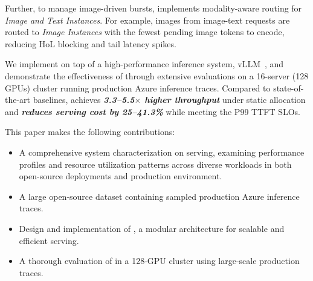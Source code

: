 Further, to manage image-driven bursts, \sysname{} implements modality-aware routing for \emph{Image and Text Instances}.
For example, images from image-text requests are routed to \emph{Image Instances} with the fewest pending image tokens to encode, reducing HoL blocking and tail latency spikes.

We implement \sysname{} on top of a high-performance inference system, vLLM~\cite{vllm}, and demonstrate the effectiveness of \sysname{} through extensive evaluations on a 16-server (128 GPUs) cluster running production Azure \lmm{} inference traces.
Compared to state-of-the-art baselines, \sysname{} achieves \textbf{\textit{3.3--5.5$\times$ higher throughput}} under static allocation and \textbf{\textit{reduces \lmm{} serving cost by 25--41.3\%}} while meeting the P99 TTFT SLOs.

This paper makes the following contributions:
\begin{itemize}[leftmargin=*]
\item A comprehensive system characterization on \lmm{} serving, examining performance profiles and resource utilization patterns across diverse workloads in both open-source \lmm deployments and production environment.
\item A large open-source dataset containing sampled production Azure \lmm{} inference traces.
\item Design and implementation of \sysname{}, a modular architecture for scalable and efficient \lmm{} serving.
\item A thorough evaluation of \sysname{} in a 128-GPU cluster using large-scale production traces.
\end{itemize}